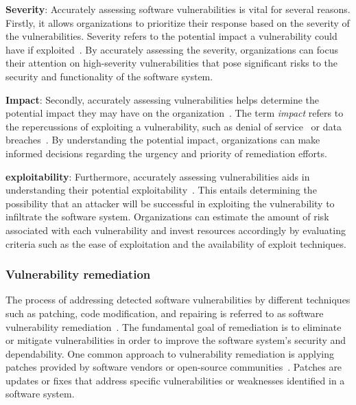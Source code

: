 \noindent \textbf{Severity}: Accurately assessing software vulnerabilities is vital for several reasons. Firstly, it allows organizations to prioritize their response based on the severity of the vulnerabilities. Severity refers to the potential impact a vulnerability could have if exploited~\cite{kudjo2019improving, chen2020automatic, kudjo2020effect, tan2020bug}. By accurately assessing the severity, organizations can focus their attention on high-severity vulnerabilities that pose significant risks to the security and functionality of the software system.

\noindent \textbf{Impact}: Secondly, accurately assessing vulnerabilities helps determine the potential impact they may have on the organization~\cite{gawron2018automatic, gong2019joint, chen2010categorization, jiang2020approach}. The term \textit{impact} refers to the repercussions of exploiting a vulnerability, such as denial of service~\cite{harzevili2022characterizing} or data breaches~\cite{aaltonen2021does}. By understanding the potential impact, organizations can make informed decisions regarding the urgency and priority of remediation efforts.

\noindent \textbf{exploitability}: Furthermore, accurately assessing vulnerabilities aids in understanding their potential exploitability~\cite{chen2019using, chen2019vest, bozorgi2010beyond}. This entails determining the possibility that an attacker will be successful in exploiting the vulnerability to infiltrate the software system. Organizations can estimate the amount of risk associated with each vulnerability and invest resources accordingly by evaluating criteria such as the ease of exploitation and the availability of exploit techniques.

\subsubsection{Vulnerability remediation}
The process of addressing detected software vulnerabilities by different techniques such as patching, code modification, and repairing is referred to as software vulnerability remediation~\cite{canfora2022patchworking, piantadosi2019fixing, chen2022neural, bhandari2021cvefixes}. The fundamental goal of remediation is to eliminate or mitigate vulnerabilities in order to improve the software system's security and dependability. One common approach to vulnerability remediation is applying patches provided by software vendors or open-source communities~\cite{xia2023automated, li2022generating, gissurarson2022propr}. Patches are updates or fixes that address specific vulnerabilities or weaknesses identified in a software system. 

